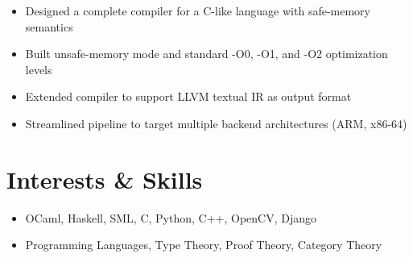 \documentclass[12pt]{article}
\begin{document}
\begin{itemize}
\itemsep-2pt
\item Designed a complete compiler for a C-like language with safe-memory semantics
\item Built unsafe-memory mode and standard -O0, -O1, and -O2 optimization levels
\item Extended compiler to support LLVM textual IR as output format
\item Streamlined pipeline to target multiple backend architectures (ARM, x86-64)
\end{itemize}

% 

\section{Interests \& Skills}

\begin{itemize}
\itemsep-2pt
\item OCaml, Haskell, SML, C, Python, C++, OpenCV, Django
\item Programming Languages, Type Theory, Proof Theory, Category Theory 
\end{itemize}
\end{document}
